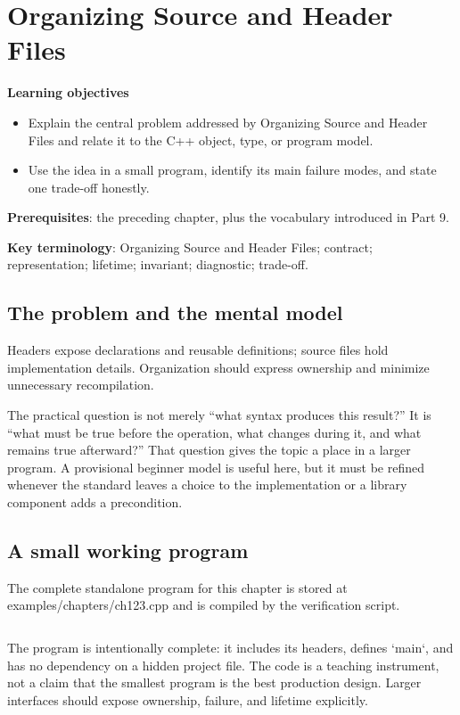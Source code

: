 \chapter{Organizing Source and Header Files}
\begin{chaptermeta}
\textbf{Learning objectives}
\begin{itemize}
  \item Explain the central problem addressed by Organizing Source and Header Files and relate it to the C++ object, type, or program model.
  \item Use the idea in a small program, identify its main failure modes, and state one trade-off honestly.
\end{itemize}
\textbf{Prerequisites}: the preceding chapter, plus the vocabulary introduced in Part 9.

\textbf{Key terminology}: Organizing Source and Header Files; contract; representation; lifetime; invariant; diagnostic; trade-off.
\end{chaptermeta}

\section{The problem and the mental model}
Headers expose declarations and reusable definitions; source files hold implementation details. Organization should express ownership and minimize unnecessary recompilation.

The practical question is not merely “what syntax produces this result?” It is “what must be true before the operation, what changes during it, and what remains true afterward?” That question gives the topic a place in a larger program. A provisional beginner model is useful here, but it must be refined whenever the standard leaves a choice to the implementation or a library component adds a precondition.

\section{A small working program}
The complete standalone program for this chapter is stored at examples/chapters/ch123.cpp and is compiled by the verification script.

\inputminted[fontsize=\scriptsize,breaklines]{cpp}{examples/chapters/ch123.cpp}

The program is intentionally complete: it includes its headers, defines `main`, and has no dependency on a hidden project file. The code is a teaching instrument, not a claim that the smallest program is the best production design. Larger interfaces should expose ownership, failure, and lifetime explicitly.

